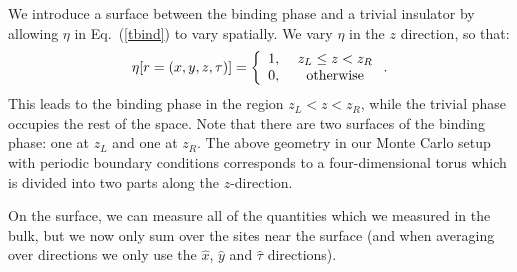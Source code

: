We introduce a surface between the binding phase and a trivial insulator by allowing $\eta$ in Eq.~(\ref{tbind}) to vary spatially.
We vary $\eta$ in the $z$ direction, so that:
\begin{equation}
\eta[r=(x,y,z,\tau)]=
\left\{ \begin{array}{cc}
1, &~ z_L\leq z<z_R\\
0, &~ \rm{otherwise}\\
\end{array}\right..
\label{eta_r}
\end{equation}
This leads to the binding phase in the region $z_L < z < z_R$, while the trivial phase occupies the rest of the space. Note that there are two surfaces of the binding phase: one at $z_L$ and one at $z_R$. The above geometry in our Monte Carlo setup with periodic boundary conditions corresponds to a four-dimensional torus which is divided into two parts along the $z$-direction.

On the surface, we can measure all of the quantities which we measured in the bulk, but we now only sum over the sites near the surface (and when averaging over directions we only use the $\hat{x}$, $\hat{y}$ and $\hat{\tau}$ directions). 

